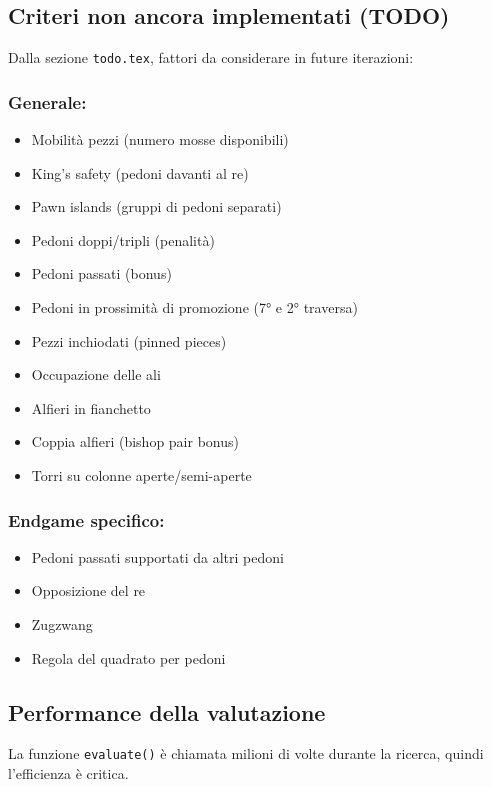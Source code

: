 \subsection{Criteri non ancora implementati (TODO)}

Dalla sezione \texttt{todo.tex}, fattori da considerare in future iterazioni:

\subsubsection{Generale:}
\begin{itemize}
\item Mobilità pezzi (numero mosse disponibili)
\item King's safety (pedoni davanti al re)
\item Pawn islands (gruppi di pedoni separati)
\item Pedoni doppi/tripli (penalità)
\item Pedoni passati (bonus)
\item Pedoni in prossimità di promozione (7° e 2° traversa)
\item Pezzi inchiodati (pinned pieces)
\item Occupazione delle ali
\item Alfieri in fianchetto
\item Coppia alfieri (bishop pair bonus)
\item Torri su colonne aperte/semi-aperte
\end{itemize}

\subsubsection{Endgame specifico:}
\begin{itemize}
\item Pedoni passati supportati da altri pedoni
\item Opposizione del re
\item Zugzwang
\item Regola del quadrato per pedoni
\end{itemize}

\subsection{Performance della valutazione}

La funzione \texttt{evaluate()} è chiamata milioni di volte durante la ricerca, quindi
l'efficienza è critica.

